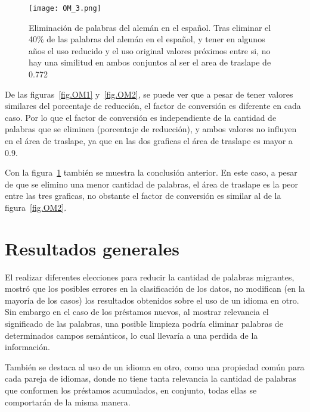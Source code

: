 \begin{figure}[]
	\centering
	\texttt{[image: OM\_3.png]}
	\caption{Eliminación de palabras del alemán en el español. Tras eliminar el 40$\%$ de las palabras del alemán en el español, y  tener en algunos años el uso reducido y el uso original valores próximos entre si, no hay una similitud en ambos conjuntos al ser el area de traslape de 0.772}
	\label{fig.OM3}
\end{figure}






De las figuras~\ref{fig.OM1} y~\ref{fig.OM2}, se puede ver que a pesar de tener valores similares del porcentaje de reducción, el factor de conversión es diferente en cada caso. Por lo que el factor de conversión es independiente de la cantidad de palabras que se eliminen (porcentaje de reducción), y ambos valores no influyen en el área de traslape, ya que en las dos graficas el área de traslape es mayor a 0.9. 

Con la figura~\ref{fig.OM3} también se muestra la conclusión anterior. En este caso, a pesar de que se elimino una menor cantidad de palabras, el área de traslape es la peor entre las tres graficas, no obstante el factor de conversión es similar al de la figura~\ref{fig.OM2}.


\section{Resultados generales}

El realizar diferentes elecciones para reducir la cantidad de palabras migrantes, mostró que los posibles errores en la clasificación de los datos, no modifican (en la mayoría de los casos) los resultados obtenidos sobre el uso de un idioma en otro. Sin embargo en el caso de los préstamos nuevos, al mostrar relevancia el significado de las palabras, una posible limpieza podría eliminar palabras de determinados campos semánticos, lo cual llevaría a una perdida de la información. 

También se destaca al uso de un idioma en otro, como una propiedad común para cada pareja de idiomas, donde no tiene tanta relevancia la cantidad de palabras que conformen los préstamos acumulados,  en conjunto, todas ellas se comportarán de la misma manera. 


